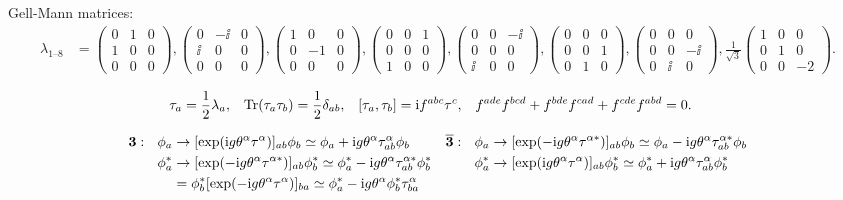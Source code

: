 \documentclass[CheatSheet]{subfiles}
\begin{document}
Gell-Mann matrices:
\begin{align}
 \lambda_{1\text{--}8} &=
  \left(\begin{smallmatrix} 0&1&0 \\ 1&0&0 \\ 0&0&0 \end{smallmatrix}\right),
  \left(\begin{smallmatrix} 0&-\ii&0 \\ \ii&0&0 \\ 0&0&0  \end{smallmatrix}\right),
  \left(\begin{smallmatrix} 1&0&0 \\ 0&-1&0 \\ 0&0&0  \end{smallmatrix}\right),
  \left(\begin{smallmatrix} 0&0&1 \\ 0&0&0 \\ 1&0&0  \end{smallmatrix}\right),
  \left(\begin{smallmatrix} 0&0&-\ii \\ 0&0&0 \\ \ii&0&0  \end{smallmatrix}\right),
  \left(\begin{smallmatrix} 0&0&0 \\ 0&0&1 \\ 0&1&0  \end{smallmatrix}\right),
  \left(\begin{smallmatrix} 0&0&0 \\ 0&0&-\ii \\ 0&\ii&0  \end{smallmatrix}\right),
  \tfrac1{\sqrt3}\left(\begin{smallmatrix} 1&0&0 \\ 0&1&0 \\ 0&0&-2 \end{smallmatrix}\right).
\end{align}

\begin{align*}
 \tau_a &= \frac{1}{2} \lambda_a,
&
 \operatorname{\mathrm{Tr}}(\tau_a \tau_b) &= \frac{1}{2}\delta_{ab},
&
 [\tau_a, \tau_b] &= \mathrm{i} f^{abc}\tau^c,
&
 f^{ade}f^{bcd} + f^{bde}f^{cad} + f^{cde}f^{abd} &= 0.
\end{align*}

\begin{align*}
\bm 3:~~\phi_a&
  \to [\exp(\mathrm{i} g \theta^\alpha \tau^\alpha)]_{ab}\phi_b
  \simeq \phi_a + \mathrm{i} g \theta^\alpha \tau^\alpha_{ab}\phi_b
&
\overline{\bm 3}:~~\phi_a&
  \to[\exp(-\mathrm{i} g \theta^\alpha \tau^{\alpha*})]_{ab}\phi_b
  \simeq \phi_a - \mathrm{i} g \theta^\alpha \tau^{\alpha*}_{ab}\phi_b
\\
\phi_a^*&
  \to[\exp(-\mathrm{i} g \theta^\alpha \tau^{\alpha*})]_{ab}\phi_b^*
 \simeq \phi_a^* - \mathrm{i} g \theta^\alpha \tau^{\alpha*}_{ab}\phi_b^*
&
\phi_a^*&
  \to[\exp(\mathrm{i} g \theta^\alpha \tau^{\alpha})]_{ab}\phi_b^*
  \simeq \phi_a^* + \mathrm{i} g \theta^\alpha \tau^{\alpha}_{ab}\phi_b^*
\\
&=\phi_b^*[\exp(-\mathrm{i} g \theta^\alpha \tau^{\alpha})]_{ba}
 \simeq \phi_a^* - \mathrm{i} g \theta^\alpha \phi_b^* \tau^{\alpha}_{ba}
\end{align*}
\end{document}
